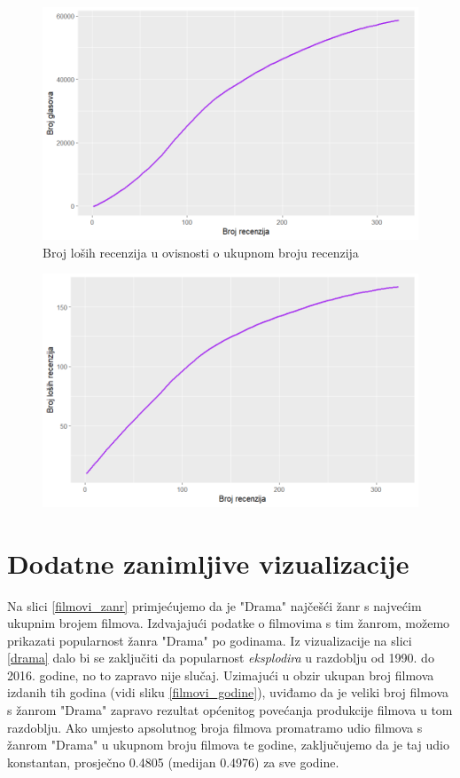 	\begin{figure}[H]
		\centering
		\includegraphics[width=15cm]{../figures/lucija_slozeni/recenzijeglasovi.png}
		\caption{Broj loših recenzija u ovisnosti o ukupnom broju recenzija}
		\label{napredni3}
	\end{figure}
	
	\begin{figure}[H]
		\centering
		\includegraphics[width=15cm]{../figures/lucija_slozeni/recenzijelose.png}
		\caption{}
		\label{napredni4}
	\end{figure}
	
	\newpage
	
	\section{Dodatne zanimljive vizualizacije}
	
	Na slici \ref{filmovi_zanr} primjećujemo da je "Drama" najčešći žanr s najvećim ukupnim brojem filmova. Izdvajajući podatke o filmovima s tim žanrom, možemo prikazati popularnost žanra "Drama" po godinama. Iz vizualizacije na slici \ref{drama} dalo bi se zaključiti da popularnost \textit{eksplodira} u razdoblju od 1990. do 2016. godine, no to zapravo nije slučaj. Uzimajući u obzir ukupan broj filmova izdanih tih godina (vidi sliku \ref{filmovi_godine}), uviđamo da je veliki broj filmova s žanrom "Drama" zapravo rezultat općenitog povećanja produkcije filmova u tom razdoblju. Ako umjesto apsolutnog broja filmova promatramo udio filmova s žanrom "Drama"  u ukupnom broju filmova te godine, zaključujemo da je taj udio konstantan, prosječno 0.4805 (medijan 0.4976) za sve godine. 
	
